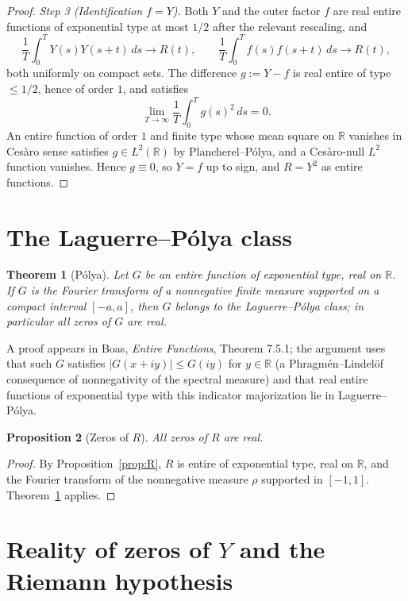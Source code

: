 \documentclass[11pt]{article}
\newtheorem{theorem}{Theorem}
\newtheorem{proposition}[theorem]{Proposition}
\theoremstyle{definition}
\theoremstyle{remark}
\begin{document}
\begin{proof}
\emph{Step 3 (Identification $f = Y$).} Both $Y$ and the outer factor $f$ are real entire functions of exponential type at most $1/2$ after the relevant rescaling, and
\[
\frac{1}{T}\int_0^T Y(s) Y(s+t)\, ds \longrightarrow R(t), \qquad
\frac{1}{T}\int_0^T f(s) f(s+t)\, ds \longrightarrow R(t),
\]
both uniformly on compact sets. The difference $g := Y - f$ is real entire of type $\leq 1/2$, hence of order $1$, and satisfies
\[
\lim_{T\to\infty} \frac{1}{T}\int_0^T g(s)^2\, ds = 0.
\]
An entire function of order $1$ and finite type whose mean square on $\mathbb R$ vanishes in Ces\`aro sense satisfies $g \in L^2(\mathbb R)$ by Plancherel--P\'olya, and a Ces\`aro-null $L^2$ function vanishes. Hence $g \equiv 0$, so $Y = f$ up to sign, and $R = Y^2$ as entire functions.
\end{proof}

\section{The Laguerre--P\'olya class}

\begin{theorem}[P\'olya]\label{thm:polya}
Let $G$ be an entire function of exponential type, real on $\mathbb R$. If $G$ is the Fourier transform of a nonnegative finite measure supported on a compact interval $[-a,a]$, then $G$ belongs to the Laguerre--P\'olya class; in particular all zeros of $G$ are real.
\end{theorem}

A proof appears in Boas, \emph{Entire Functions}, Theorem 7.5.1; the argument uses that such $G$ satisfies $|G(x+iy)| \leq G(iy)$ for $y \in \mathbb R$ (a Phragm\'en--Lindel\"of consequence of nonnegativity of the spectral measure) and that real entire functions of exponential type with this indicator majorization lie in Laguerre--P\'olya.

\begin{proposition}[Zeros of $R$]\label{prop:realzeros}
All zeros of $R$ are real.
\end{proposition}

\begin{proof}
By Proposition~\ref{prop:R}, $R$ is entire of exponential type, real on $\mathbb R$, and the Fourier transform of the nonnegative measure $\rho$ supported in $[-1,1]$. Theorem~\ref{thm:polya} applies.
\end{proof}

\section{Reality of zeros of $Y$ and the Riemann hypothesis}
\end{document}
